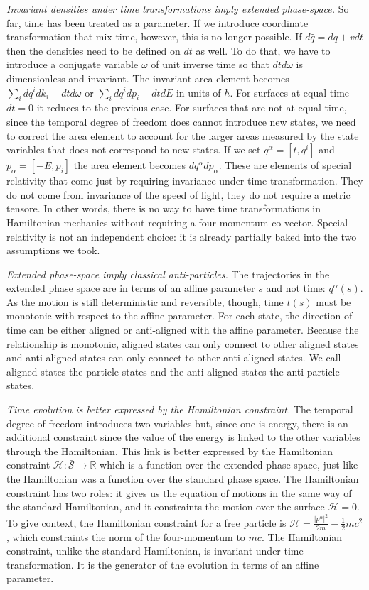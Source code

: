\documentclass[twocolumn]{article}
\begin{document}
\emph{Invariant densities under time transformations imply extended phase-space.} So far, time has been treated as a parameter. If we introduce coordinate transformation that mix time, however, this is no longer possible. If $d\hat{q} = dq + vdt$ then the densities need to be defined on $dt$ as well. To do that, we have to introduce a conjugate variable $\omega$ of unit inverse time so that $dt d\omega$ is dimensionless and invariant. The invariant area element becomes $\sum_i dq^i dk_i - dt d\omega$ or $\sum_i dq^i dp_i - dt dE$ in units of $\hbar$. For surfaces at equal time $dt=0$ it reduces to the previous case. For surfaces that are not at equal time, since the temporal degree of freedom does cannot introduce new states, we need to correct the area element to account for the larger areas measured by the state variables that does not correspond to new states. If we set $q^\alpha = [t, q^i]$ and $p_\alpha = [-E, p_i]$ the area element becomes $dq^\alpha dp_\alpha$. These are elements of special relativity that come just by requiring invariance under time transformation. They do not come from invariance of the speed of light, they do not require a metric tensore. In other words, there is no way to have time transformations in Hamiltonian mechanics without requiring a four-momentum co-vector. Special relativity is not an independent choice: it is already partially baked into the two assumptions we took.

\emph{Extended phase-space imply classical anti-particles.} The trajectories in the extended phase space are in terms of an affine parameter $s$ and not time: $q^\alpha(s)$. As the motion is still deterministic and reversible, though, time $t(s)$ must be monotonic with respect to the affine parameter. For each state, the direction of time can be either aligned or anti-aligned with the affine parameter. Because the relationship is monotonic, aligned states can only connect to other aligned states and anti-aligned states can only connect to other anti-aligned states. We call aligned states the particle states and the anti-aligned states the anti-particle states.

\emph{Time evolution is better expressed by the Hamiltonian constraint.} The temporal degree of freedom introduces two variables but, since one is energy, there is an additional constraint since the value of the energy is linked to the other variables through the Hamiltonian. This link is better expressed by the Hamiltonian constraint $\mathcal{H} : \mathcal{\bar{S}} \to \mathbb{R}$ which is a function over the extended phase space, just like the Hamiltonian was a function over the standard phase space. The Hamiltonian constraint has two roles: it gives us the equation of motions in the same way of the standard Hamiltonian, and it constraints the motion over the surface $\mathcal{H} = 0$. To give context, the Hamiltonian constraint for a free particle is $\mathcal{H} = \frac{|p^\alpha|^2}{2m} - \frac{1}{2}mc^2$, which constraints the norm of the four-momentum to $mc$. The Hamiltonian constraint, unlike the standard Hamiltonian, is invariant under time transformation. It is the generator of the evolution in terms of an affine parameter.
\end{document}
